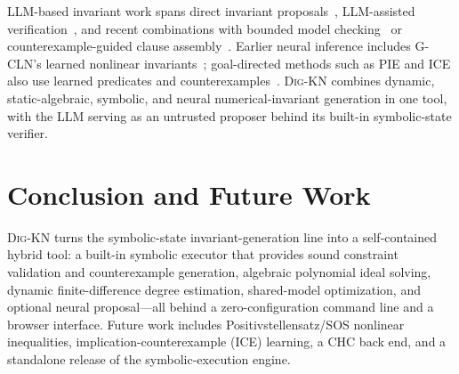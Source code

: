 \documentclass[runningheads]{llncs}
\newcommand{\tool}{\textsc{Dig-KN}\xspace}
\begin{document}
LLM-based invariant work spans direct invariant proposals~\cite{pei2023llminv,kamath2023loopy},
LLM-assisted verification~\cite{wu2024lemur}, and recent combinations with
bounded model checking~\cite{wu2024llmbmc,pirzada2024llmbmc} or
counterexample-guided clause assembly~\cite{cao2025clause2inv}. Earlier neural
inference includes G-CLN's learned nonlinear invariants~\cite{yao2020gcln};
goal-directed methods such as PIE and ICE also use learned predicates and
counterexamples~\cite{padhi2016pie,garg2016ice}. \tool{} combines dynamic,
static-algebraic, symbolic, and neural numerical-invariant generation in one
tool, with the LLM serving as an untrusted proposer behind its built-in
symbolic-state verifier.

\section{Conclusion and Future Work}
\label{sec:concl}

\tool{} turns the symbolic-state invariant-generation line into a self-contained
hybrid tool: a built-in symbolic executor that provides sound constraint
validation and counterexample generation, algebraic polynomial ideal solving, dynamic
finite-difference degree estimation, shared-model optimization, and optional neural
proposal---all behind a zero-configuration command line and a browser interface.
Future work includes Positivstellensatz/SOS nonlinear inequalities,
implication-counterexample (ICE) learning, a CHC back end, and a standalone
release of the symbolic-execution engine.

% 
% 
\end{document}
